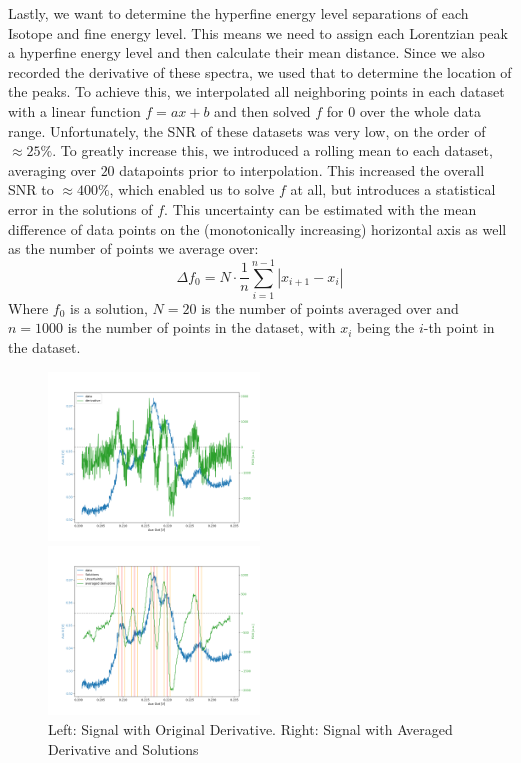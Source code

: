 \documentclass[12pt, a4paper]{article}
\begin{document}
Lastly, we want to determine the hyperfine energy level separations of each Isotope and fine energy level. This means we need to assign each Lorentzian peak a hyperfine energy level and then calculate their mean distance. Since we also recorded the derivative of these spectra, we used that to determine the location of the peaks. To achieve this, we interpolated all neighboring points in each dataset with a linear function $f = ax + b$ and then solved $f$ for $0$ over the whole data range. Unfortunately, the SNR of these datasets was very low, on the order of $\approx 25\%$. To greatly increase this, we introduced a rolling mean to each dataset, averaging over $20$ datapoints prior to interpolation. This increased the overall SNR to $\approx 400\%$, which enabled us to solve $f$ at all, but introduces a statistical error in the solutions of $f$. This uncertainty can be estimated with the mean difference of data points on the (monotonically increasing) horizontal axis as well as the number of points we average over:
\begin{equation}
\Delta f_0 = N \cdot \frac{1}{n} \sum_{i = 1}^{n - 1} \left\lvert x_{i + 1} - x_i \right\rvert
\label{interpolationuncertainty}
\end{equation}
Where $f_0$ is a solution, $N = 20$ is the number of points averaged over and $n = 1000$ is the number of points in the dataset, with $x_i$ being the $i$-th point in the dataset.

\begin{figure}
    \centering
    \parbox{0.45\textwidth}{
        \includegraphics[width=0.5\textwidth]{originalderivative.png}
    }
    \hfill
    \parbox{0.45\textwidth}{
        \includegraphics[width=0.5\textwidth]{averagedderivative.png}
    }
    \caption{\small Left: Signal with Original Derivative. Right: Signal with Averaged Derivative and Solutions}
    \label{lorentzianprofile}
\end{figure}
\end{document}
